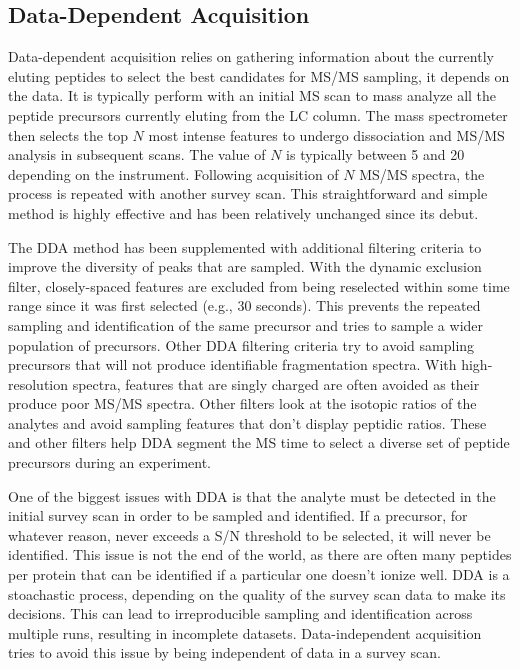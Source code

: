 \subsection*{Data-Dependent Acquisition}
Data-dependent acquisition relies on gathering information about the currently eluting peptides to select the best candidates for MS/MS sampling, it depends on the data. It is typically perform with an initial MS scan to mass analyze all the peptide precursors currently eluting from the LC column. The mass spectrometer then selects the top $N$ most intense \mz{} features to undergo dissociation and MS/MS analysis in subsequent scans. The value of $N$ is typically between 5 and 20 depending on the instrument. Following acquisition of $N$ MS/MS spectra, the process is repeated with another survey scan. This straightforward and simple method is highly effective and has been relatively unchanged since its debut.

The DDA method has been supplemented with additional filtering criteria to improve the diversity of \mz{} peaks that are sampled. With the dynamic exclusion filter, closely-spaced \mz{} features are excluded from being reselected within some time range since it was first selected (e.g., 30 seconds). This prevents the repeated sampling and identification of the same precursor and tries to sample a wider population of precursors. Other DDA filtering criteria try to avoid sampling precursors that will not produce identifiable fragmentation spectra. With high-resolution spectra, \mz{} features that are singly charged are often avoided as their produce poor MS/MS spectra. Other filters look at the isotopic ratios of the analytes and avoid sampling features that don't display peptidic ratios. These and other filters help DDA segment the MS time to select a diverse set of peptide precursors during an experiment.

One of the biggest issues with DDA is that the analyte must be detected in the initial survey scan in order to be sampled and identified. If a precursor, for whatever reason, never exceeds a S/N threshold to be selected, it will never be identified. This issue is not the end of the world, as there are often many peptides per protein that can be identified if a particular one doesn't ionize well. DDA is a stoachastic process, depending on the quality of the survey scan data to make its decisions. This can lead to irreproducible sampling and identification across multiple runs, resulting in incomplete datasets. Data-independent acquisition tries to avoid this issue by being independent of data in a survey scan.

